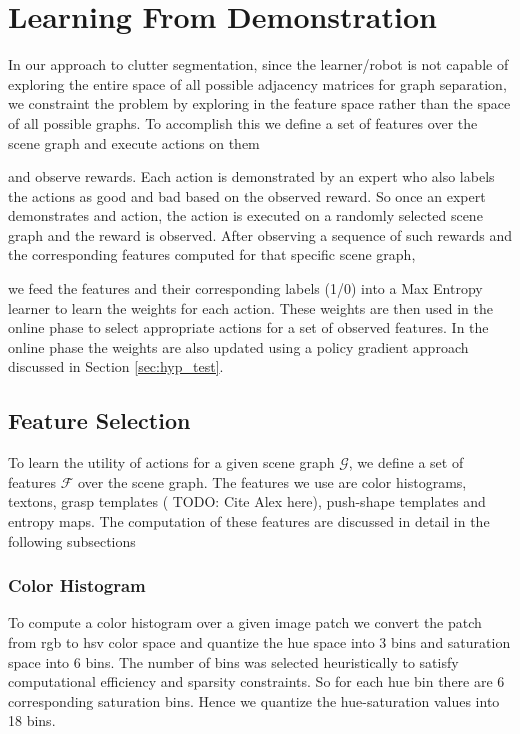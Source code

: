 \section{Learning From Demonstration}
\label{sec:lfd}
In our approach to clutter segmentation, since the learner/robot is not capable of exploring the entire space of all possible adjacency matrices for graph separation, we constraint the problem by exploring in the feature space rather than the space of all possible graphs. To accomplish this we define a set of features over the scene graph and execute actions on them 

and observe rewards. Each action is demonstrated by an expert who also labels the actions as good and bad based on the observed reward. So once an expert demonstrates and action, the action is executed on a randomly selected scene graph and the reward is observed. After observing a sequence of such rewards and the corresponding features computed for that specific scene graph,

we feed the features and their corresponding labels (1/0) into a Max Entropy learner to learn the weights for each action. These weights are then used in the online phase to select appropriate actions for a set of observed features. In the online phase the weights are also updated using a policy gradient approach discussed in Section \ref{sec:hyp_test}.

\subsection{Feature Selection}
To learn the utility of actions for a given scene graph $\mathcal{G}$, we define a set of features $\mathcal{F}$ over the scene graph. The features we use are color histograms, textons, grasp templates (\cite{Javidi12_Journal} TODO: Cite Alex here), push-shape templates and entropy maps. The computation of these features are discussed in detail in the following subsections

\subsubsection{Color Histogram}
To compute a color histogram over a given image patch we convert the patch from rgb to hsv color space and quantize the hue space into 3 bins and saturation space into 6 bins. The number of bins was selected heuristically to satisfy computational efficiency and sparsity constraints. So for each hue bin there are 6 corresponding saturation bins. Hence we quantize the hue-saturation values into 18 bins.

